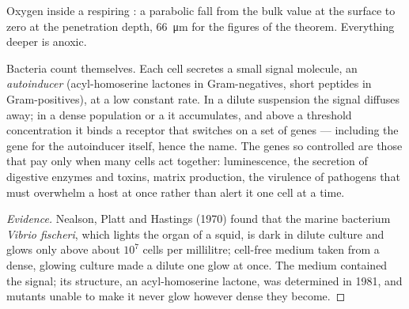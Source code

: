 \begin{omfigure}

{\small Oxygen inside a respiring : a parabolic fall from the
bulk value at the surface to zero at the penetration depth,
\qty{66}{\micro m} for the figures of the theorem. Everything deeper
is anoxic.}
\end{omfigure}

\begin{proposition}\label{prop:b2:microbial-metabolism:quorum}
Bacteria count themselves. Each cell secretes a small signal
molecule, an \emph{autoinducer} (acyl-homoserine lactones in
Gram-negatives, short peptides in Gram-positives), at a low constant
rate. In a dilute suspension the signal diffuses away; in a dense
population or a  it accumulates, and above a threshold
concentration it binds a receptor that switches on a set of genes
--- including the gene for the autoinducer itself, hence the name.
The genes so controlled are those that pay only when many cells act
together: luminescence, the secretion of digestive enzymes and
toxins, matrix production, the virulence of pathogens that must
overwhelm a host at once rather than alert it one cell at a time.
\end{proposition}
\begin{proof}[Evidence]
Nealson, Platt and Hastings (1970) found that the marine bacterium
\emph{Vibrio fischeri}, which lights the organ of a squid, is dark in
dilute culture and glows only above about $10^{7}$ cells per
millilitre; cell-free medium taken from a dense, glowing culture
made a dilute one glow at once. The medium contained the signal; its
structure, an acyl-homoserine lactone, was determined in 1981, and
mutants unable to make it never glow however dense they become.
\end{proof}

